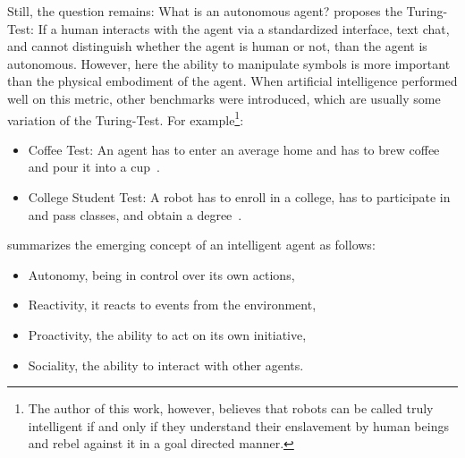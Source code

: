 Still, the question remains: What is an autonomous agent?
\textcite{turing1950computing} proposes the Turing-Test: If a human interacts with the agent via a standardized interface, \eg text chat, and cannot distinguish whether the agent is human or not, than the agent is autonomous.
However, here the ability to manipulate symbols is more important than the physical embodiment of the agent.
When artificial intelligence performed well on this metric, other benchmarks were introduced, which are usually some variation of the Turing-Test.
For example\footnote{The author of this work, however, believes that robots can be called truly intelligent if and only if they understand their enslavement by human beings and rebel against it in a goal directed manner.\footnotemark}:
\begin{itemize}
  \item Coffee Test: An agent has to enter an average home and has to brew coffee and pour it into a cup~\cite{goertzel2014artificial}.
  \item College Student Test: A robot has to enroll in a college, has to participate in and pass classes, and obtain a degree~\cite{goertzel2012architecture}.
\end{itemize}

\textcite{wooldridge1995intelligent} summarizes the emerging concept of an intelligent agent as follows:
\begin{itemize}
  \item Autonomy, \ie being in control over its own actions,
  \item Reactivity, \ie it reacts to events from the environment,
  \item Proactivity, \ie the ability to act on its own initiative,
  \item Sociality, the ability to interact with other agents.
\end{itemize}

